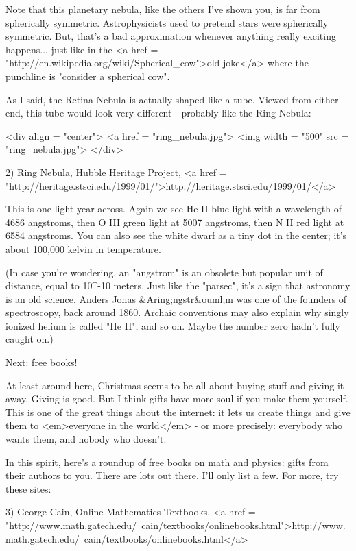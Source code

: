 Note that this planetary nebula, like the others I've shown you, is 
far from spherically symmetric.  Astrophysicists used to pretend stars 
were spherically symmetric.  But, that's a bad approximation whenever 
anything really exciting happens... just like in the 
<a href = "http://en.wikipedia.org/wiki/Spherical_cow">old joke</a> where 
the punchline is "consider a spherical cow".

As I said, the Retina Nebula is actually shaped like a tube.  Viewed 
from either end, this tube would look very different - probably like 
the Ring Nebula:

<div align = "center">
<a href = "ring_nebula.jpg">
<img width = "500" src = "ring_nebula.jpg">
</div>

2) Ring Nebula, Hubble Heritage Project, 
<a href = "http://heritage.stsci.edu/1999/01/">http://heritage.stsci.edu/1999/01/</a>

This is one light-year across.  Again we see He II blue light with a
wavelength of 4686 
angstroms, then O III green light at 5007
angstroms,
then N II red light at 6584 
angstroms.  You can also see
the white dwarf as a tiny dot in the center; it's about 100,000 kelvin
in temperature.

(In case you're wondering, an "angstrom" is an 
obsolete but popular unit of distance, equal to 10^{-10} meters.  
Just like
the "parsec", it's a sign that astronomy is an old science.
Anders Jonas &Aring;ngstr&ouml;m was one of the founders of spectroscopy, back
around 1860.  Archaic conventions may also explain why singly ionized
helium is called "He II", and so on.  Maybe the number zero
hadn't fully caught on.)

Next: free books!

At least around here, Christmas seems to be all about buying stuff and
giving it away.  Giving is good.  But I think gifts have more soul if
you make them yourself.  This is one of the great things about the
internet: it lets us create things and give them to <em>everyone in
the world</em> - or more precisely: everybody who wants them, and
nobody who doesn't.

In this spirit, here's a roundup of free books on math and physics: 
gifts from their authors to you.  There are lots out there.   I'll 
only list a few.  For more, try these sites:

3) George Cain, Online Mathematics Textbooks, 
<a href = "http://www.math.gatech.edu/~cain/textbooks/onlinebooks.html">http://www.math.gatech.edu/~cain/textbooks/onlinebooks.html</a>

